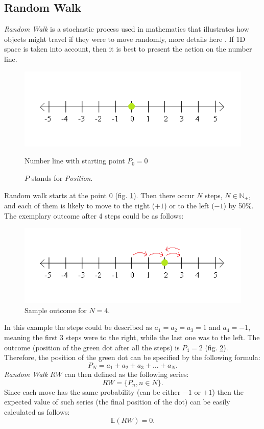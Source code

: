     \subsection{Random Walk}
        \textit{Random Walk} is a stochastic process used in mathematics that illustrates how objects might travel if they were to move randomly, more details here \cite{randomWalk}.
        If 1D space is taken into account, then it is best to present the action on the number line.
        \begin{figure}[H]
            \centering
            \includegraphics{img/numberLine.png}
            \caption{Number line with starting point $P_0=0$}
            \caption*{$P$ stands for \textit{Position}.}
            \label{fig:numberLine_start}
        \end{figure}
        Random walk starts at the point 0 (fig. \ref{fig:numberLine_start}). Then there occur $N$ steps, $N \in \mathbb{N}_+$, and each of them is likely to move to the right ($+1$) or to the left ($-1$) by 50\%. The exemplary outcome after 4 steps could be as follows:
        \begin{figure}[H]
            \centering
            \includegraphics{img/numberLine_end.png}
            \caption{Sample outcome for $N=4$.}
            \label{fig:numberLine_end}
        \end{figure}
        In this example the steps could be described as $a_1 = a_2 = a_3 = 1$ and $a_4 = -1$, meaning the first 3 steps were to the right, while the last one was to the left. The outcome (position of the green dot after all the steps) is $P_4 = 2$ (fig. \ref{fig:numberLine_end}).
        Therefore, the position of the green dot can be specified by the following formula:
        \[  %
        P_N = a_1 + a_2 + a_3 + \ldots + a_N
        .
        \]
        \textit{Random Walk} $RW$ can then defined as the following series:
        \[
        RW = \{P_n, n \in N\}
        .
        \]
        Since each move has the same probability (can be either $-1$ or $+1$) then the expected value of such series (the final position of the dot) can be easily calculated as follows:
        \[
        \mathbb{E}(RW) = 0
        .
        \]
        

